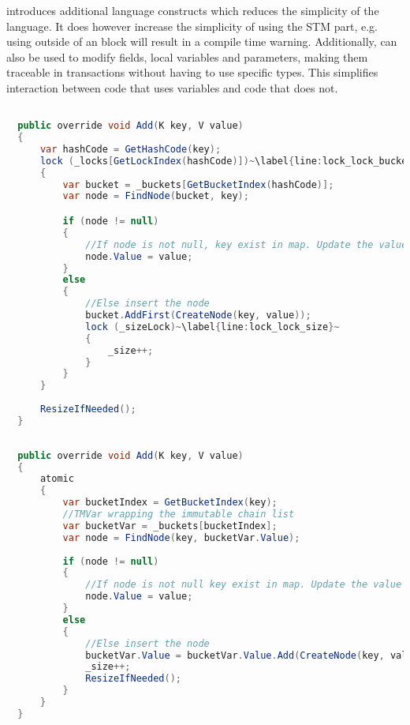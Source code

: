 \stmnamesp introduces additional language constructs which reduces the simplicity of the language. It does however increase the simplicity of using the \ac{STM} part, e.g. using  outside of an  block will result in a compile time warning. Additionally,  can also be used to modify fields, local variables and parameters, making them traceable in transactions without having to use specific types. This simplifies interaction between code that uses  variables and code that does not. 

\begin{lstlisting}[float,label=lst:lock_add_hashmap,
  caption={ConcurrentHashMap \bscode{Add} Method - Locking},
  language=Java,  
  showspaces=false,
  showtabs=false,
  breaklines=true,
  showstringspaces=false,
  breakatwhitespace=true,
  escapechar=~,
  commentstyle=\color{greencomments},
  keywordstyle=\color{bluekeywords},
  stringstyle=\color{redstrings},
  morekeywords={atomic, retry, orelse, var, get, set, ref, out}]  % Start your code-block

  public override void Add(K key, V value)
  {
      var hashCode = GetHashCode(key);
      lock (_locks[GetLockIndex(hashCode)])~\label{line:lock_lock_bucket}~
      {
          var bucket = _buckets[GetBucketIndex(hashCode)];
          var node = FindNode(bucket, key);

          if (node != null)
          {
              //If node is not null, key exist in map. Update the value
              node.Value = value;
          }
          else
          {
              //Else insert the node
              bucket.AddFirst(CreateNode(key, value));
              lock (_sizeLock)~\label{line:lock_lock_size}~
              {
                  _size++;
              }
          }
      }
      
      ResizeIfNeeded();
  }
\end{lstlisting}

\begin{lstlisting}[float,label=lst:lang_add_hashmap,
  caption={ConcurrentHashMap \bscode{Add} Method - \stmname},
  language=Java,  
  showspaces=false,
  showtabs=false,
  breaklines=true,
  showstringspaces=false,
  breakatwhitespace=true,
  escapechar=~,
  commentstyle=\color{greencomments},
  keywordstyle=\color{bluekeywords},
  stringstyle=\color{redstrings},
  morekeywords={atomic, retry, orelse, var, get, set, ref, out}]  % Start your code-block
  
  public override void Add(K key, V value)
  {
      atomic
      {
          var bucketIndex = GetBucketIndex(key);
          //TMVar wrapping the immutable chain list
          var bucketVar = _buckets[bucketIndex];
          var node = FindNode(key, bucketVar.Value);
         
          if (node != null)
          {
              //If node is not null key exist in map. Update the value
              node.Value = value;
          }
          else
          {
              //Else insert the node
              bucketVar.Value = bucketVar.Value.Add(CreateNode(key, value));
              _size++;
              ResizeIfNeeded();
          }
      }
  }
\end{lstlisting}

